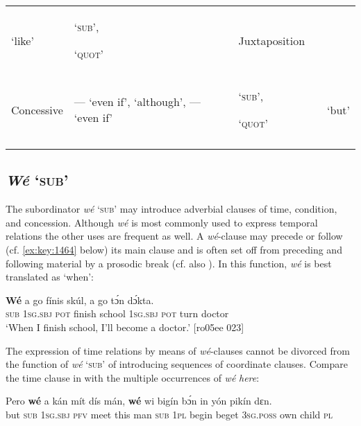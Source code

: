 \begin{sidewaystable}
\begin{tabularx}{\textwidth}{lQQQQ}
  ‘like’ &  ‘\textsc{sub}’, 

  ‘\textsc{quot}’ & Juxtaposition & \\
Concessive &  —  ‘even if’,  ‘although’,  —  ‘even if’ &  ‘\textsc{sub}’,

  ‘\textsc{quot}’ &  &  ‘but’\\
\lspbottomrule
\end{tabularx}
\end{sidewaystable}


\subsection{\textit{Wé} ‘\textsc{sub’}}\label{sec:10.7.1}

The subordinator \textit{wé} ‘\textsc{sub}’ may introduce adverbial clauses of time, condition, and concession. Although \textit{wé} is most commonly used to express temporal relations the other uses are frequent as well. A \textit{wé}{}-clause may precede  or follow (cf. \ref{ex:key:1464} below) its main clause and is often set off from preceding and following material by a prosodic break (cf. also ). In this function, \textit{wé} is best translated as ‘when’:


\ea%
    \label{ex:key:1458}
    \gll \textbf{Wé}  a    go  fínis    skúl,  a    go  tɔ́n    dɔ́kta.\\
\textsc{sub}  \textsc{1sg.sbj}  \textsc{pot}  finish  school  \textsc{1sg.sbj}  \textsc{pot}  turn    doctor\\

\glt ‘When I finish school, I’ll become a doctor.’ [ro05ee 023]
\z

The expression of time relations by means of \textit{wé}{}-clauses cannot be divorced from the function of \textit{wé} ‘\textsc{sub’} of introducing sequences of coordinate clauses. Compare the time clause in  with the multiple occurrences of \textit{wé} \textit{\textup{here}}:


\ea%
    \label{ex:key:1459}
    \gll Pero    \textbf{wé}  a    kán  mít    dís  mán,  \textbf{wé}  wi  bigín  bɔ́n
in    yón     pikín  dɛn.\\
but    \textsc{sub}  \textsc{1sg.sbj}  \textsc{pfv}  meet  this  man    \textsc{sub}  \textsc{1pl}  begin  beget
\textsc{3sg.poss}  own    child  \textsc{pl}\\

